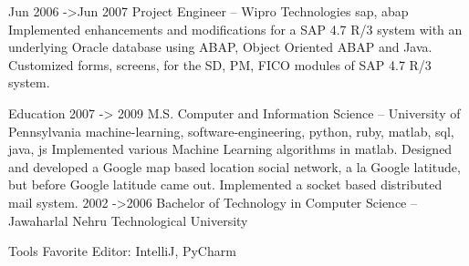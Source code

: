 \documentclass{article}
\begin{document}
Jun 2006 ->Jun 2007 Project Engineer – Wipro Technologies
sap, abap
Implemented enhancements and modifications for a SAP 4.7 R/3 system with an underlying Oracle database using ABAP, Object Oriented ABAP and
Java.
Customized forms, screens, for the SD, PM, FICO modules of SAP 4.7 R/3 system.


Education
2007 -> 2009 M.S. Computer and Information Science – University of Pennsylvania
machine-learning, software-engineering, python, ruby, matlab, sql, java, js
Implemented various Machine Learning algorithms in matlab.
Designed and developed a Google map based location social network, a la Google latitude, but before Google latitude came out.
Implemented a socket based distributed mail system.
2002 ->2006 Bachelor of Technology in Computer Science – Jawaharlal Nehru Technological University

Tools
Favorite Editor: IntelliJ, PyCharm
\end{document}
